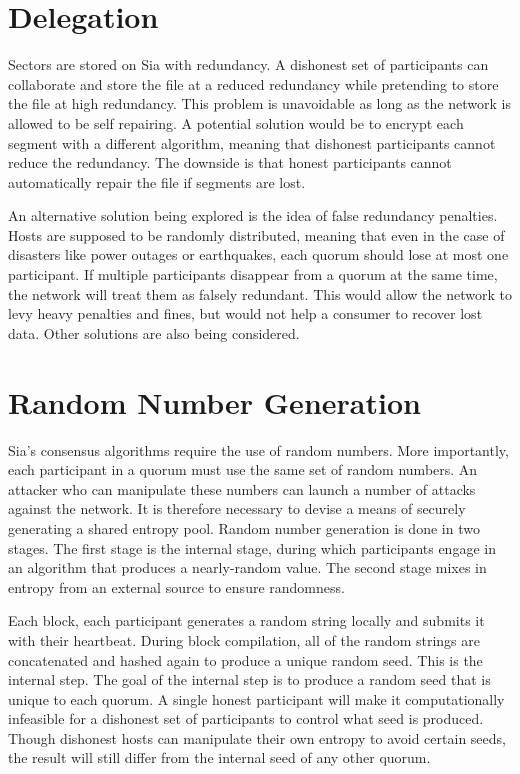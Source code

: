 \documentclass[twocolumn]{article}
\begin{document}
\section{Delegation}
Sectors are stored on Sia with redundancy.
A dishonest set of participants can collaborate and store the file at a reduced redundancy while pretending to store the file at high redundancy.
This problem is unavoidable as long as the network is allowed to be self repairing.
A potential solution would be to encrypt each segment with a different algorithm, meaning that dishonest participants cannot reduce the redundancy.
The downside is that honest participants cannot automatically repair the file if segments are lost.

An alternative solution being explored is the idea of false redundancy penalties.
Hosts are supposed to be randomly distributed, meaning that even in the case of disasters like power outages or earthquakes, each quorum should lose at most one participant.
If multiple participants disappear from a quorum at the same time, the network will treat them as falsely redundant.
This would allow the network to levy heavy penalties and fines, but would not help a consumer to recover lost data.
Other solutions are also being considered.

\section{Random Number Generation}
Sia's consensus algorithms require the use of random numbers.
More importantly, each participant in a quorum must use the same set of random numbers.
An attacker who can manipulate these numbers can launch a number of attacks against the network.
It is therefore necessary to devise a means of securely generating a shared entropy pool.
Random number generation is done in two stages.
The first stage is the internal stage, during which participants engage in an algorithm that produces a nearly-random value.
The second stage mixes in entropy from an external source to ensure randomness.

Each block, each participant generates a random string locally and submits it with their heartbeat.
During block compilation, all of the random strings are concatenated and hashed again to produce a unique random seed.
This is the internal step.
The goal of the internal step is to produce a random seed that is unique to each quorum.
A single honest participant will make it computationally infeasible for a dishonest set of participants to control what seed is produced.
Though dishonest hosts can manipulate their own entropy to avoid certain seeds, the result will still differ from the internal seed of any other quorum.
\end{document}

